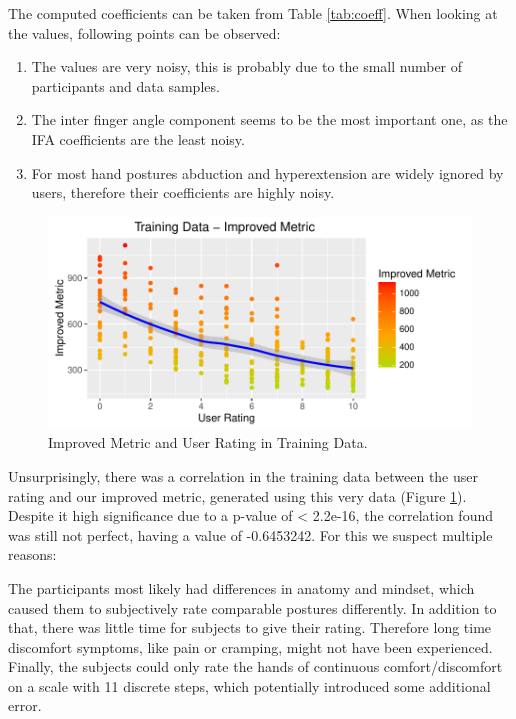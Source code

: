The computed coefficients can be taken from Table \ref{tab:coeff}. When looking at the values, following points can be observed: 
\begin{enumerate}
	\item The values are very noisy, this is probably due to the small number of participants and data samples. 
	\item The inter finger angle component seems to be the most important one, as the IFA coefficients are the least noisy.
	\item For most hand postures abduction and hyperextension are widely ignored by users, therefore their coefficients are highly noisy. 
\end{enumerate}

\begin{figure}[h]
\centering
\includegraphics[width=\textwidth]{TrainingDataImproved}
\caption{Improved Metric and User Rating in Training Data.}
\label{fig:trainingData}
\end{figure}

Unsurprisingly, there was a correlation in the training data between the user rating and our improved metric, generated using this very data (Figure \ref{fig:trainingData}). Despite it high significance due to a p-value of < 2.2e-16, the correlation found was still not perfect, having a value of -0.6453242. For this we suspect multiple reasons: 

The participants most likely had differences in anatomy and mindset, which caused them to subjectively rate comparable postures differently. In addition to that, there was little time for subjects to give their rating. Therefore long time discomfort symptoms, like pain or cramping, might not have been experienced. Finally, the subjects could only rate the hands of continuous comfort/discomfort on a scale with 11 discrete steps, which potentially introduced some additional error.

